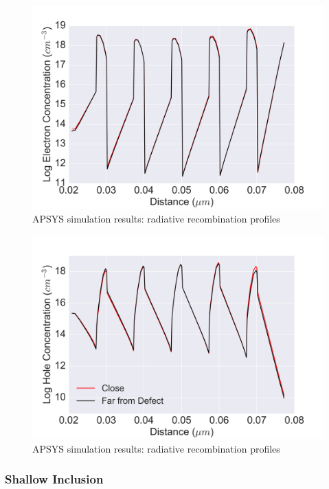 \begin{figure}[h]
	\centering
	\includegraphics[width=1\textwidth]{Figs/Ch3/5A_elec.png}
	\caption[h] {APSYS simulation results: radiative recombination profiles}
	\label{deep-elec}
\end{figure}
\FloatBarrier  

\begin{figure}[h]
	\centering
	\includegraphics[width=1\textwidth]{Figs/Ch3/5A_hole.png}
	\caption[h] {APSYS simulation results: radiative recombination profiles}
	\label{deep-hole}
\end{figure}
\FloatBarrier  

\subsubsection{Shallow Inclusion}

